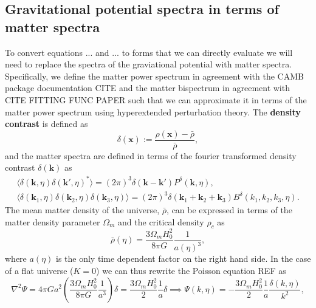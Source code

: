 \documentclass[11pt]{article} %
\newcommand{\br}[1]{\ensuremath{\left( #1 \right)}}
\begin{document}
\subsection{Gravitational potential spectra in terms of matter spectra}
To convert equations ... and ... to forms that we can directly evaluate we will need to replace the spectra of the graviational potential with matter spectra. Specifically, we define the matter power spectrum in agreement with the CAMB package documentation CITE and the matter bispectrum in agreement with CITE FITTING FUNC PAPER such that we can approximate it in terms of the matter power spectrum using hyperextended perturbation theory. The \textbf{density contrast} is defined as
\begin{equation}
    \delta(\mathbf x) := \frac{\rho(\mathbf x)-\bar \rho}{\bar\rho},
\end{equation}
and the matter spectra are defined in terms of the fourier transformed density contrast $\delta(\mathbf k)$ as 
\begin{gather*}
    \langle \delta(\mathbf k, \eta) \delta(\mathbf k', \eta)^* \rangle = (2\pi)^3\delta(\mathbf k - \mathbf k')P^\delta(\mathbf k, \eta),\\
    \langle \delta(\mathbf k_1, \eta) \delta(\mathbf k_2, \eta) \delta(\mathbf k_3, \eta) \rangle = (2\pi)^3\delta(\mathbf k_1 + \mathbf k_2 + \mathbf k_3)B^\delta(k_1, k_2, k_3, \eta).
\end{gather*}
The mean matter density of the universe, \( \bar{\rho} \), can be expressed in terms of the matter density parameter \( \Omega_m \) and the critical density \( \rho_c \) as 
$$
\bar{\rho}(\eta) = \frac{3 \Omega_m H_0^2}{8 \pi G}\frac{1}{a(\eta)^3},
$$
where $a(\eta)$ is the only time dependent factor on the right hand side.
In the case of a flat universe ($K=0$) we can thus rewrite the Poisson equation REF as
\begin{equation}
    \nabla^2\Psi = 4\pi G a^2\br{\frac{3\Omega_m H_0^2}{8\pi G}\frac{1}{a^3}}\delta = \frac{3\Omega_m H_0^2}{2} \frac{1}{a}\delta \implies \Psi(k, \eta) = -\frac{3\Omega_m H_0^2}{2}\frac{1}{a}\frac{\delta(k, \eta)}{k^2},
\end{equation}
\end{document}
